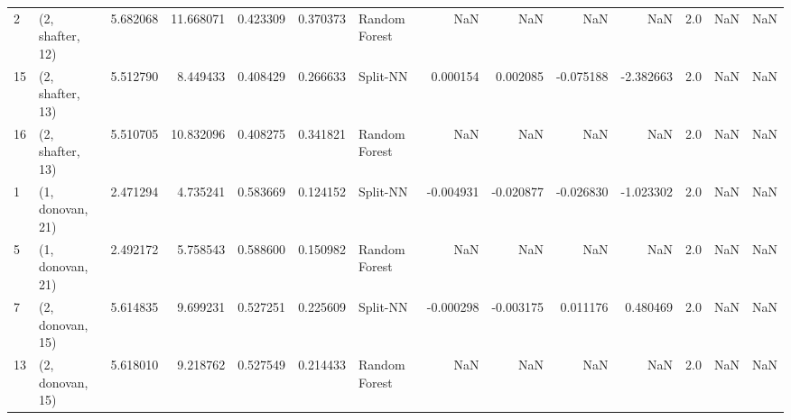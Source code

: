 \begin{tabular}{llrrrrlrrrrrrl}
2  &  (2, shafter, 12) &   5.682068 &  11.668071 &   0.423309 &  0.370373 &  Random Forest &             NaN &           NaN &            NaN &          NaN &            2.0 &    NaN &              NaN \\
15 &  (2, shafter, 13) &   5.512790 &   8.449433 &   0.408429 &  0.266633 &       Split-NN &        0.000154 &      0.002085 &      -0.075188 &    -2.382663 &            2.0 &    NaN &              NaN \\
16 &  (2, shafter, 13) &   5.510705 &  10.832096 &   0.408275 &  0.341821 &  Random Forest &             NaN &           NaN &            NaN &          NaN &            2.0 &    NaN &              NaN \\
1  &  (1, donovan, 21) &   2.471294 &   4.735241 &   0.583669 &  0.124152 &       Split-NN &       -0.004931 &     -0.020877 &      -0.026830 &    -1.023302 &            2.0 &    NaN &              NaN \\
5  &  (1, donovan, 21) &   2.492172 &   5.758543 &   0.588600 &  0.150982 &  Random Forest &             NaN &           NaN &            NaN &          NaN &            2.0 &    NaN &              NaN \\
7  &  (2, donovan, 15) &   5.614835 &   9.699231 &   0.527251 &  0.225609 &       Split-NN &       -0.000298 &     -0.003175 &       0.011176 &     0.480469 &            2.0 &    NaN &              NaN \\
13 &  (2, donovan, 15) &   5.618010 &   9.218762 &   0.527549 &  0.214433 &  Random Forest &             NaN &           NaN &            NaN &          NaN &            2.0 &    NaN &              NaN \\
\bottomrule
\end{tabular}
